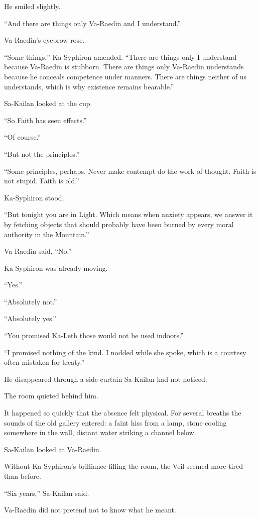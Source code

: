 He smiled slightly.\par
“And there are things only Va-Raedin and I understand.”\par
Va-Raedin’s eyebrow rose.\par
“Some things,” Ka-Syphiron amended. “There are things only I understand because Va-Raedin is stubborn. There are things only Va-Raedin understands because he conceals competence under manners. There are things neither of us understands, which is why existence remains bearable.”\par
Sa-Kailan looked at the cup.\par
“So Faith has seen effects.”\par
“Of course.”\par
“But not the principles.”\par
“Some principles, perhaps. Never make contempt do the work of thought. Faith is not stupid. Faith is old.”\par
Ka-Syphiron stood.\par
“But tonight you are in Light. Which means when anxiety appears, we answer it by fetching objects that should probably have been burned by every moral authority in the Mountain.”\par
Va-Raedin said, “No.”\par
Ka-Syphiron was already moving.\par
“Yes.”\par
“Absolutely not.”\par
“Absolutely yes.”\par
“You promised Ka-Leth those would not be used indoors.”\par
“I promised nothing of the kind. I nodded while she spoke, which is a courtesy often mistaken for treaty.”\par
He disappeared through a side curtain Sa-Kailan had not noticed.\par
The room quieted behind him.\par
It happened so quickly that the absence felt physical. For several breaths the sounds of the old gallery entered: a faint hiss from a lamp, stone cooling somewhere in the wall, distant water striking a channel below.\par
Sa-Kailan looked at Va-Raedin.\par
Without Ka-Syphiron’s brilliance filling the room, the Veil seemed more tired than before.\par
“Six years,” Sa-Kailan said.\par
Va-Raedin did not pretend not to know what he meant.\par
